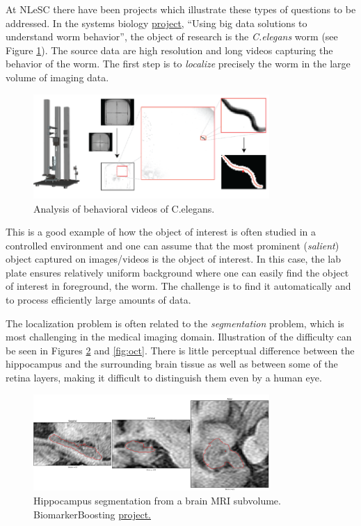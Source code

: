  At NLeSC there have been projects which illustrate these types of questions to be addressed. In the systems biology  \href{https://blog.surf.nl/en/eyr4-blog-5-using-big-data-solutions-to-understand-worm-behavior/}{\underline{project}}, ``Using big data solutions to understand worm behavior'', the object of research is the {\em C.elegans} worm (see Figure \ref{fig:Celegans}). The source data are high resolution and long videos capturing the behavior of the worm. The first step is to {\em localize} precisely the worm in the large volume of imaging data. 
\begin{figure}[H]
\begin{center}
\includegraphics[width=0.8\textwidth]{fig/Celegans}
\end{center}
\caption{Analysis of behavioral videos of C.elegans.}
\label{fig:Celegans}
\end{figure}
This is a good example of how the object of interest is often studied in a controlled environment and one can assume that the most prominent ({\em salient}) object captured on images/videos is the object of interest. In this case, the lab plate ensures relatively uniform background where one can easily find the object of interest in foreground, the worm. The challenge is to find it automatically and to process efficiently large amounts of data.

The localization problem is often related to the {\em segmentation} problem, which is most challenging in the medical imaging domain. Illustration of the difficulty can be seen in Figures \ref{fig:hippo} and \ref{fig:oct}. There is little perceptual difference between the hippocampus and the surrounding brain tissue as well as between some of the retina layers, making it difficult to distinguish them even by a human eye.

\begin{figure}[H]
\begin{center}
\includegraphics[width=0.8\textwidth]{fig/hippo}
\end{center}
\caption{Hippocampus segmentation from a brain MRI subvolume. BiomarkerBoosting \href{https://www.esciencecenter.nl/project/biomarker-boosting}{\underline{project.}}}
\label{fig:hippo}
\end{figure}


